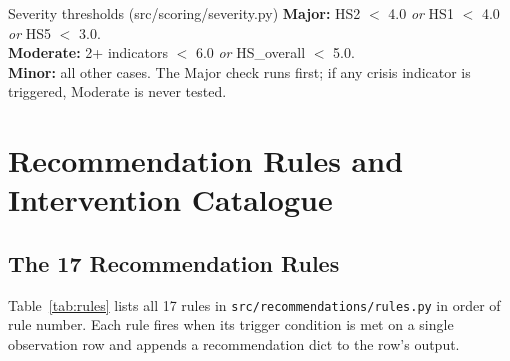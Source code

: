 \documentclass[11pt,a4paper,openany]{book}
\begin{document}
\begin{keybox}{Severity thresholds (src/scoring/severity.py)}
\textbf{Major:} HS2 $<$ 4.0 \emph{or} HS1 $<$ 4.0 \emph{or} HS5 $<$ 3.0. \\
\textbf{Moderate:} 2+ indicators $<$ 6.0 \emph{or} HS\_overall $<$ 5.0. \\
\textbf{Minor:} all other cases.
The Major check runs first; if any crisis indicator is triggered, Moderate is never tested.
\end{keybox}

\chapter{Recommendation Rules and Intervention Catalogue}

\section*{The 17 Recommendation Rules}

Table~\ref{tab:rules} lists all 17 rules in \texttt{src/recommendations/rules.py}
in order of rule number.  Each rule fires when its trigger condition is met on a
single observation row and appends a recommendation dict to the row's output.
\end{document}

